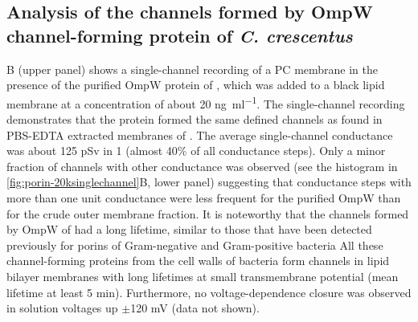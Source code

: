 \subsection{Analysis of the channels formed by OmpW channel-forming protein of \textit{C. crescentus}}

B (upper panel) shows a single-channel recording of a \ac{PC} membrane in the presence of the purified OmpW protein of \caulobacter, which was added to a black lipid membrane at a concentration of about 20 \si{\nano\gram\per\milli\litre}. The single-channel recording demonstrates that the protein formed the same defined channels as found in \ac{PBS}-\ac{EDTA} extracted membranes of \caulobacter. The average single-channel conductance was about 125 \si{\pico\sievert} in 1 \si{\molar}  (almost 40\% of all conductance steps). Only a minor fraction of channels with other conductance was observed (see the histogram in \cref{fig:porin-20ksinglechannel}B, lower panel) suggesting that conductance steps with more than one unit conductance were less frequent for the purified OmpW than for the crude outer membrane fraction. It is noteworthy that the channels formed by OmpW of \caulobacter had a long lifetime, similar to those that have been detected previously for porins of Gram-negative and Gram-positive bacteria All these channel-forming proteins from the cell walls of bacteria form channels in lipid bilayer membranes with long lifetimes at small transmembrane potential (mean lifetime at least 5 min). Furthermore, no voltage-dependence closure was observed in  solution voltages up $\pm$120 mV (data not shown). 

